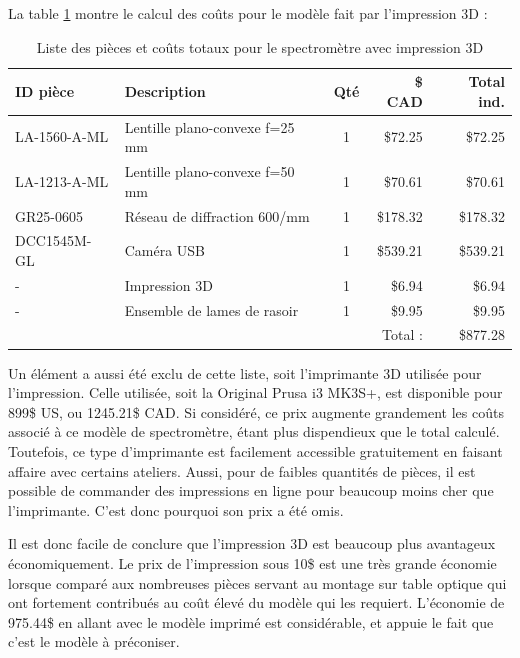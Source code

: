 \documentclass[11pt,letterpaper]{article}
\begin{document}

La table \ref{prix_3D} montre le calcul des coûts pour le modèle fait par l'impression 3D :

\begin{table}[!ht]
    \centering
    \caption{Liste des pièces et coûts totaux pour le spectromètre avec impression 3D}
    \begin{tabular}{|l|l|c|r|r|}
    \hline
        ID pièce & Description & Qté & \$ CAD & Total ind. \\ \hline\hline
        LA-1560-A-ML & Lentille plano-convexe f=25 mm & 1 & \$72.25 & \$72.25 \\ \hline
        LA-1213-A-ML & Lentille plano-convexe f=50 mm & 1 & \$70.61 & \$70.61 \\ \hline
        GR25-0605 & Réseau de diffraction 600/mm & 1 & \$178.32 & \$178.32 \\ \hline
        DCC1545M-GL & Caméra USB & 1 & \$539.21 & \$539.21 \\ \hline
        - & Impression 3D & 1 & \$6.94 & \$6.94 \\ \hline
        - & Ensemble de lames de rasoir & 1 & \$9.95 & \$9.95 \\ \hline\hline
        ~ & ~ & ~ & Total : & \$877.28 \\ \hline
    \end{tabular}
    \label{prix_3D}
\end{table}

Un élément a aussi été exclu de cette liste, soit l'imprimante 3D utilisée pour l'impression.
Celle utilisée, soit la Original Prusa i3 MK3S+, est disponible pour 899\$ US, ou 1245.21\$ CAD.
Si considéré, ce prix augmente grandement les coûts associé à ce modèle de spectromètre, étant
plus dispendieux que le total calculé. Toutefois, ce type d'imprimante est facilement accessible
gratuitement en faisant affaire avec certains ateliers. Aussi, pour de faibles quantités de
pièces, il est possible de commander des impressions en ligne pour beaucoup moins cher que
l'imprimante. C'est donc pourquoi son prix a été omis.

Il est donc facile de conclure que l'impression 3D est beaucoup plus avantageux économiquement.
Le prix de l'impression sous 10\$ est une très grande économie lorsque comparé aux nombreuses
pièces servant au montage sur table optique qui ont fortement contribués au coût élevé du
modèle qui les requiert. L'économie de 975.44\$ en allant avec le modèle imprimé est
considérable, et appuie le fait que c'est le modèle à préconiser.



% 
% 
\end{document}

